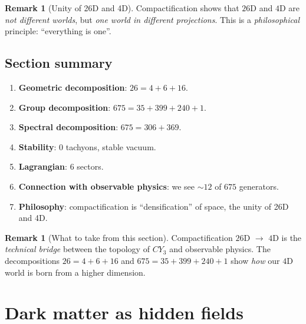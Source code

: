 \documentclass[11pt,a4paper]{article}
\newcommand{\CY}{CY_3}
\theoremstyle{definition}
\newtheorem{remark}[theorem]{Remark}
\begin{document}
\begin{remark}[Unity of 26D and 4D]
\label{rem:unity-26-4}
Compactification shows that $26$D and $4$D are 
\emph{not different worlds}, but \emph{one world in different projections}. 
This is a \emph{philosophical} principle: ``everything is one''.
\end{remark}

\subsection{Section summary}
\label{subsec:comp-summary}

\begin{enumerate}
    \item \textbf{Geometric decomposition}: $26 = 4 + 6 + 16$.
    \item \textbf{Group decomposition}: 
          $675 = 35 + 399 + 240 + 1$.
    \item \textbf{Spectral decomposition}: 
          $675 = 306 + 369$.
    \item \textbf{Stability}: $0$ tachyons, stable vacuum.
    \item \textbf{Lagrangian}: $6$ sectors.
    \item \textbf{Connection with observable physics}: we see $\sim 12$ 
          of $675$ generators.
    \item \textbf{Philosophy}: compactification is ``densification'' 
          of space, the unity of 26D and 4D.
\end{enumerate}

\begin{remark}[What to take from this section]
\label{rem:comp-takeaway}
Compactification $26$D $\to$ $4$D is the \emph{technical bridge} 
between the topology of $\CY$ and observable physics. 
The decompositions $26 = 4 + 6 + 16$ and $675 = 35 + 399 + 240 + 1$ 
show \emph{how} our $4$D world is born from a higher dimension.
\end{remark}

\section{Dark matter as hidden fields}
\label{sec:dark}
\end{document}
